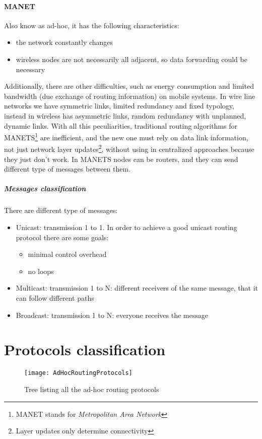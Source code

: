 \paragraph*{MANET} Also know as ad-hoc, it has the following characteristics:
\begin{itemize}
\item the network constantly changes
\item wireless nodes are not necessarily all adjacent, so data forwarding
  could be necessary
\end{itemize}
Additionally, there are other difficulties, such as energy consumption and
limited bandwidth (due exchange of routing information) on mobile systems. In
wire line networks we have symmetric links, limited redundancy and fixed
typology, instead in wireless has asymmetric links, random redundancy with
unplanned, dynamic links. With all this peculiarities, traditional routing
algorithms for MANETS\footnote{MANET stands for \textit{Metropolitan Area
    Network}} are inefficient, and the new one must rely on data link
information, not just network layer updates\footnote{Layer updates only
  determine connectivity}, without using in centralized approaches because they
just don't work. In MANETS nodes can be routers, and they can send different
type of messages between them.
\subparagraph*{Messages classification} There are different type of messages:
\begin{itemize}
\item Unicast: transmission 1 to 1. In order to achieve a good unicast routing
  protocol there are some goals:
  \begin{itemize}
  \item minimal control overhead
  \item no loops
  \end{itemize}
\item Multicast: transmission 1 to N: different receivers of the same message,
  that it can follow different paths
\item Broadcast: transmission 1 to N: everyone receives the message
\end{itemize}

\section{Protocols classification}

\begin{figure}[t]
  \centering
  \texttt{[image: AdHocRoutingProtocols]}
  \caption{Tree listing all the ad-hoc routing protocols}
  \label{fig:mac:adHocRoutingProtocols}
\end{figure}

